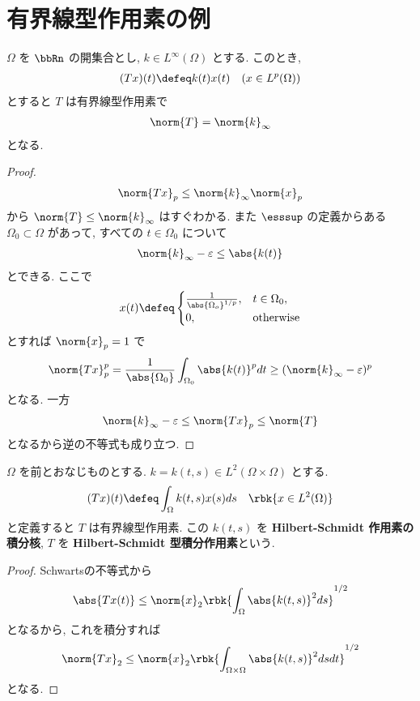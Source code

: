 \documentclass[openany, a4paper, oneside]{jsbook}
\begin{document}
\section{有界線型作用素の例}

\begin{ex}[かけ算作用素]
$\Omega$ を $\bbRn$ の開集合とし,
$k \in L^{\infty}(\Omega)$ とする.
このとき,
\begin{align}
 (Tx)(t)
 \defeq
 k(t)x(t) \quad (x \in L^p(\Omega))
\end{align}
とすると $T$ は有界線型作用素で
\begin{align}
 \norm{T}
 =
 \norm{k}_{\infty}
\end{align}
となる.
\end{ex}
\begin{proof}
\begin{align}
 \norm{T x}_p
 \leq
 \norm{k}_{\infty} \norm{x}_{p}
\end{align}
から $\norm{T} \leq \norm{k}_{\infty}$ はすぐわかる.
また $\esssup$ の定義からある $\Omega_0 \subset \Omega$ があって,
すべての $t \in \Omega_0$ について
\begin{align}
 \norm{k}_{\infty} - \varepsilon
 \leq
 \abs{k(t)}
\end{align}
とできる.
ここで
\begin{align}
 x(t)
 \defeq
 \begin{cases}
  \frac{1}{\abs{\Omega_o}^{1/p}}, & t \in \Omega_0, \\
  0, & \text{otherwise}
 \end{cases}
\end{align}
とすれば $\norm{x}_p = 1$ で
\begin{align}
 \norm{Tx}_p^p
 =
 \frac{1}{\abs{\Omega_0}} \int_{\Omega_0} \abs{k(t)}^p dt
 \geq
 (\norm{k}_{\infty} - \varepsilon)^p
\end{align}
となる.
一方
\begin{align}
 \norm{k}_{\infty} - \varepsilon
 \leq
 \norm{Tx}_p
 \leq
 \norm{T}
\end{align}
となるから逆の不等式も成り立つ.
\end{proof}

\begin{ex}
$\Omega$ を前とおなじものとする.
$k = k(t, s) \in L^2(\Omega \times \Omega)$
とする.
\begin{align}
 (Tx)(t)
 \defeq
 \int_{\Omega} k(t, s) x(s) ds \quad \rbk{x \in L^2(\Omega)}
\end{align}
と定義すると $T$ は有界線型作用素.
この $k(t, s)$ を \textbf{Hilbert-Schmidt 作用素の積分核},
$T$ を \textbf{Hilbert-Schmidt 型積分作用素}という.
\end{ex}
\begin{proof}
Schwartsの不等式から
\begin{align}
 \abs{Tx(t)}
 \leq
 \norm{x}_2 \rbk{\int_{\Omega} \abs{k(t, s)}^2 ds}^{1/2}
\end{align}
となるから, これを積分すれば
\begin{align}
 \norm{Tx}_2
 \leq
 \norm{x}_2
 \rbk{\int_{\Omega \times \Omega} \abs{k(t, s)}^2 ds dt}^{1/2}
\end{align}
となる.
\end{proof}
\end{document}
